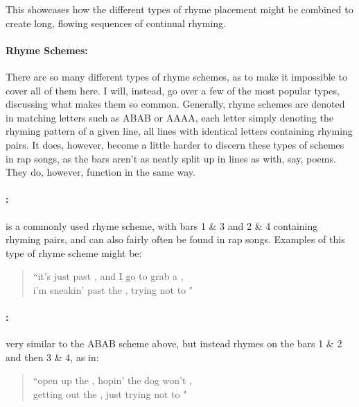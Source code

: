 This showcases how the different types of rhyme placement might be combined to create long, flowing sequences of continual rhyming.

\paragraph{Rhyme Schemes:\\[6pt]}
\label{para:rhyme-schemes}

There are so many different types of rhyme schemes, as to make it impossible to cover all of them here. I will, instead, go over a few of the most popular types, discussing what makes them so common. Generally, rhyme schemes are denoted in matching letters such as ABAB or AAAA, each letter simply denoting the rhyming pattern of a given line, all lines with identical letters containing rhyming pairs. It does, however, become a little harder to discern these types of schemes in rap songs, as the bars aren't as neatly split up in lines as with, say, poems. They do, however, function in the same way.

\paragraph{:} is a commonly used rhyme scheme, with bars 1 \& 3 and 2 \& 4 containing rhyming pairs, and can also fairly often be found in rap songs. Examples of this type of rhyme scheme might be:

\begin{quote}\small{
    “it's just past , and I go to grab a ,\\ i'm sneakin' past the , trying not to "}
\end{quote}

\paragraph{:} very similar to the ABAB scheme above, but instead rhymes on the bars 1 \& 2 and then 3 \& 4, as in:

\begin{quote}\small{
    “open up the , hopin' the dog won't ,\\ getting out the , just trying not to "}
\end{quote}

